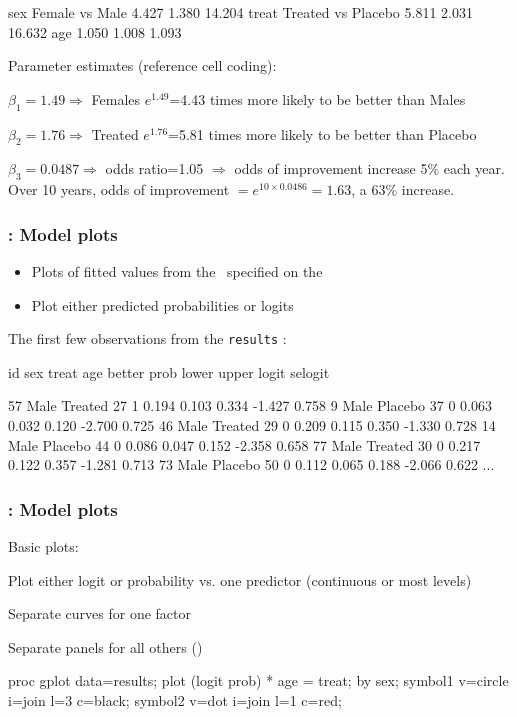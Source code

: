 \begin{frame}[fragile]
\begin{Output}[gobble=1,fontsize=\footnotesize]
    sex   Female vs Male           4.427       1.380      14.204
    treat Treated vs Placebo       5.811       2.031      16.632
    age                            1.050       1.008       1.093
\end{Output}
Parameter estimates (reference cell coding):
\begin{itemize*}
  \item $\beta_1 = 1.49 \Rightarrow$ Females $e^{1.49}$=4.43 times more likely to be better than Males
  \item $\beta_2 = 1.76 \Rightarrow$ Treated $e^{1.76}$=5.81 times more likely to be better than Placebo
  \item $\beta_3 = 0.0487 \Rightarrow$ odds ratio=1.05 $\Rightarrow$ odds of improvement
  increase 5\% each year.  Over 10 years, odds of improvement
  $= e^{10 \times 0.0486}= 1.63$, a 63\% increase.  
\end{itemize*}
\end{frame}

\begin{frame}[fragile]
  \frametitle{: Model plots}
  \begin{itemize}
	\item Plots of fitted values from the \Dset\ specified on the 
	\item Plot either predicted probabilities or logits
  \end{itemize}
The first few observations from the \texttt{results} \Dset:
\begin{Output}[gobble=2,fontsize=\footnotesize]
   id sex   treat  age better   prob  lower  upper  logit selogit

   57 Male Treated  27    1    0.194  0.103  0.334 -1.427  0.758 
    9 Male Placebo  37    0    0.063  0.032  0.120 -2.700  0.725 
   46 Male Treated  29    0    0.209  0.115  0.350 -1.330  0.728 
   14 Male Placebo  44    0    0.086  0.047  0.152 -2.358  0.658 
   77 Male Treated  30    0    0.217  0.122  0.357 -1.281  0.713 
   73 Male Placebo  50    0    0.112  0.065  0.188 -2.066  0.622 
    ...
\end{Output}

\end{frame}

\begin{frame}[fragile]
  \frametitle{: Model plots}
Basic plots:
  \begin{itemize*}
	\item Plot either logit or probability vs. one predictor (continuous or most levels)
	\item Separate curves for one factor
	\item Separate panels for all others ()
  \end{itemize*}

\begin{listing}
proc gplot data=results;
   plot (logit prob) * age = treat; 
   by sex;
   symbol1 v=circle i=join l=3 c=black;
   symbol2 v=dot    i=join l=1 c=red;
\end{listing}
\end{frame}

